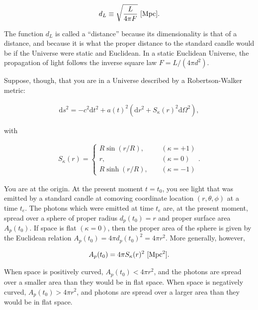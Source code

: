 \documentclass[a4paper,11pt]{article}
\begin{document}
\begin{align*}
    d_L \equiv \sqrt{\frac{L}{4\pi F}} ~ [{\rm Mpc}].
\end{align*}

{\noindent}The function $d_L$ is called a ``distance'' because its dimensionality is that of a distance, and because it is what the proper distance to the standard candle would be if the Universe were static and Euclidean. In a static Euclidean Universe, the propagation of light follows the inverse square law $F = L/(4\pi d^2)$.

{\noindent}Suppose, though, that you are in a Universe described by a Robertson-Walker metric:

\begin{align*}
    \mathrm{d}s^2 = - c^2\mathrm{d}t^2 + a(t)^2(\mathrm{d}r^2 + S_\kappa(r)^2\mathrm{d}\Omega^2),
\end{align*}

{\noindent}with 

\begin{align*}
    S_\kappa(r) =
    \left\{
    \begin{aligned}
    R\sin(r/R), ~~~~~& (\kappa = +1) \\
              r,~~~~~& (\kappa = 0) \\
    R\sinh(r/R),~~~~~& (\kappa = -1)
    \end{aligned}
    \right.
    .
\end{align*}

{\noindent}You are at the origin. At the present moment $t = t_0$, you see light that was emitted by a standard candle at comoving coordinate location $(r,\theta,\phi)$ at a time $t_e$. The photons which were emitted at time $t_e$ are, at the present moment, spread over a sphere of proper radius $d_p(t_0) = r$ and proper surface area $A_p(t_0)$. If space is flat $(\kappa=0)$, then the proper area of the sphere is given by the Euclidean relation $A_p(t_0) = 4\pi d_p(t_0)^2 = 4\pi r^2$. More generally, however,

\begin{align*}
    A_p(t_0) = 4\pi S_\kappa(r)^2 ~ [{\rm Mpc^2}].
\end{align*}

{\noindent}When space is positively curved, $A_p(t_0) < 4\pi r^2$, and the photons are spread over a smaller area than they would be in flat space. When space is negatively curved, $A_p(t_0) > 4\pi r^2$, and photons are spread over a larger area than they would be in flat space.
\end{document}
